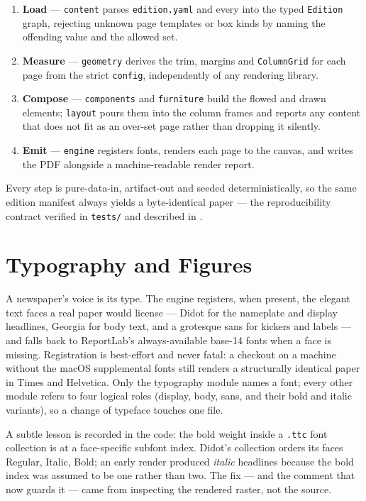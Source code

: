 \documentclass[
  english,
]{article}
\providecommand{\tightlist}{%
  \setlength{\itemsep}{0pt}\setlength{\parskip}{0pt}}
\begin{document}
\begin{enumerate}
\def\labelenumi{\arabic{enumi}.}
\tightlist
\item
  \textbf{Load} --- \texttt{content} parses \texttt{edition.yaml} and
  every  into the typed \texttt{Edition}
  graph, rejecting unknown page templates or box kinds by naming the
  offending value and the allowed set.
\item
  \textbf{Measure} --- \texttt{geometry} derives the trim, margins and
  \texttt{ColumnGrid} for each page from the strict \texttt{config},
  independently of any rendering library.
\item
  \textbf{Compose} --- \texttt{components} and \texttt{furniture} build
  the flowed and drawn elements; \texttt{layout} pours them into the
  column frames and reports any content that does not fit as an over-set
  page rather than dropping it silently.
\item
  \textbf{Emit} --- \texttt{engine} registers fonts, renders each page
  to the canvas, and writes the PDF alongside a machine-readable render
  report.
\end{enumerate}

Every step is pure-data-in, artifact-out and seeded deterministically,
so the same edition manifest always yields a byte-identical paper ---
the reproducibility contract verified in \texttt{tests/} and described
in .

\newpage

\section{Typography and Figures}\label{typography-and-figures}

A newspaper's voice is its type. The engine registers, when present, the
elegant text faces a real paper would license --- Didot for the
nameplate and display headlines, Georgia for body text, and a grotesque
sans for kickers and labels --- and falls back to ReportLab's
always-available base-14 fonts when a face is missing. Registration is
best-effort and never fatal: a checkout on a machine without the macOS
supplemental fonts still renders a structurally identical paper in Times
and Helvetica. Only the typography module names a font; every other
module refers to four logical roles (display, body, sans, and their bold
and italic variants), so a change of typeface touches one file.

A subtle lesson is recorded in the code: the bold weight inside a
\texttt{.ttc} font collection is at a face-specific subfont index.
Didot's collection orders its faces Regular, Italic, Bold; an early
render produced \emph{italic} headlines because the bold index was
assumed to be one rather than two. The fix --- and the comment that now
guards it --- came from inspecting the rendered raster, not the source.
\end{document}
